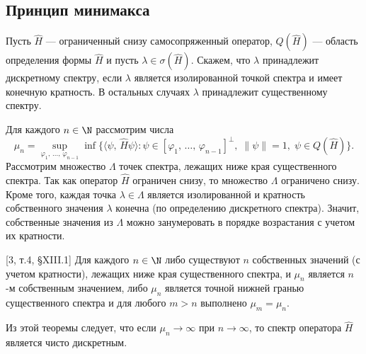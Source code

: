 \documentclass[a4paper
]{article}
\begin{document}
\subsection{Принцип минимакса}
Пусть $\hat H$ --- ограниченный снизу самосопряженный оператор,
$Q(\hat H)$ --- область определения формы $\hat H$ и пусть $\lambda\in
\sigma(\hat H)$. Скажем, что $\lambda$ принадлежит дискретному спектру,
если $\lambda$ является изолированной точкой спектра и имеет конечную
кратность. В остальных случаях $\lambda$ принадлежит существенному
спектру. \par
Для каждого $n\in \N$ рассмотрим числа
$$\mu_n=\sup_{\varphi_1, \, \dots, \, \varphi_{n-1}}\inf \{\langle
\psi, \, \hat H\psi\rangle:\psi\in [\varphi_1, \, \dots, \, \varphi_{n-1}]
^{\bot}, \; \|\psi\|=1, \; \psi\in Q(\hat H)\}.$$
Рассмотрим множество $\Lambda$ точек спектра, лежащих ниже края существенного
спектра. Так как оператор $\hat H$ ограничен снизу, то множество
$\Lambda$ ограничено снизу. Кроме того, каждая точка $\lambda\in \Lambda$
является изолированной и кратность собственного значения $\lambda$
конечна (по определению дискретного спектра). Значит, собственные
значения из $\Lambda$ можно занумеровать в порядке возрастания с
учетом их кратности.
\begin{Trm}
{\rm [3, т.4, \S XIII.1]} Для каждого $n\in \N$ либо существуют
$n$ собственных значений (с учетом кратности), лежащих ниже края
существенного спектра, и $\mu_n$ является $n$-м собственным значением,
либо $\mu_n$ является точной нижней гранью существенного спектра и
для любого $m>n$ выполнено $\mu_m=\mu_n$.
\end{Trm}
Из этой теоремы следует, что если $\mu_n\rightarrow \infty$ при $n\rightarrow
\infty$, то спектр оператора $\hat H$ является чисто дискретным.
\end{document}
